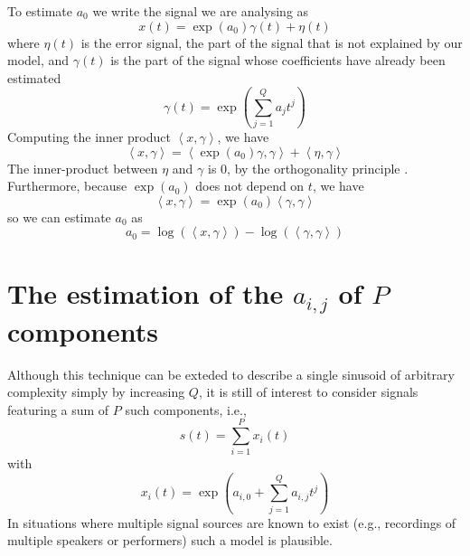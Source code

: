 \documentclass[twoside,a4paper]{article}
\begin{document}
To estimate $a_0$ we write the signal we are analysing as
\[
    x(t) = \exp(a_0) \gamma(t) + \eta (t)
\]
where $\eta (t)$ is the error signal, the part of the signal that is not explained
by our model, and $\gamma (t)$ is the part of the signal
whose coefficients have already been estimated
\[
    \gamma(t) = \exp \left( \sum_{j=1}^{Q} a_j t^{j} \right)
\]
Computing the inner product $\left\langle x , \gamma \right\rangle$, we have
\[
    \left\langle x , \gamma \right\rangle
    =
    \left\langle \exp(a_0) \gamma , \gamma \right\rangle + 
        \left\langle \eta , \gamma \right\rangle
\]
The inner-product between $\eta$ and $\gamma$ is $0$, by the orthogonality
principle \cite[ch.~12]{kay1993fundamentals}. Furthermore, because $\exp(a_0)$ does not
depend on $t$, we have
\[
    \left\langle x , \gamma \right\rangle
    =
    \exp(a_0) \left\langle \gamma , \gamma \right\rangle
\]
so we can estimate $a_0$ as
\begin{equation}
    \label{eq:ddmesta0}
    a_0 = \log \left( \left\langle x , \gamma \right\rangle \right)
        - \log \left( \left\langle \gamma , \gamma \right\rangle \right)
\end{equation}

\section{The estimation of the $a_{i,j}$ of $P$ components}

Although this technique can be exteded to describe a single
sinusoid of arbitrary complexity simply by increasing $Q$, it is still of
interest to consider signals featuring a sum of $P$ such components, i.e.,
%
\begin{equation}
    \label{eq:polyphaseexpmix}
    s(t) = \sum_{i=1}^{P} x_{i}(t)
\end{equation}
%
with
%
\[
    x_{i}(t) = \exp(a_{i,0} + \sum_{j=1}^{Q} a_{i,j} t^j)
\]
%
In situations where multiple signal sources are known to exist (e.g., recordings
of multiple speakers or performers) such a model is plausible.
\end{document}
